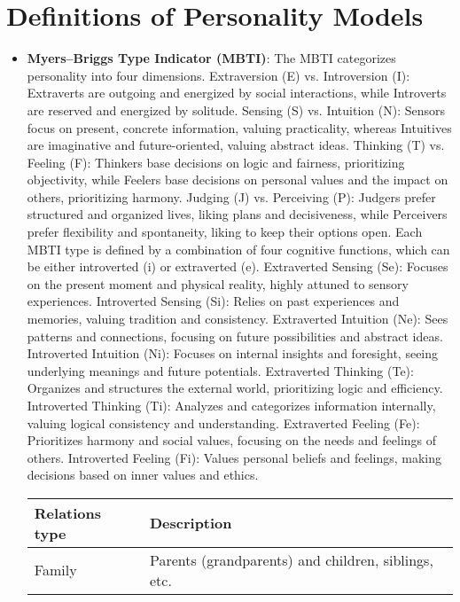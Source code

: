\appendix
\section{Definitions of Personality Models}
\label{sec:appendixA}

\begin{itemize}
  \item \textbf{Myers–Briggs Type Indicator (MBTI)}: The MBTI categorizes personality into four dimensions. Extraversion (E) vs. Introversion (I): Extraverts are outgoing and energized by social interactions, while Introverts are reserved and energized by solitude. Sensing (S) vs. Intuition (N): Sensors focus on present, concrete information, valuing practicality, whereas Intuitives are imaginative and future-oriented, valuing abstract ideas. Thinking (T) vs. Feeling (F): Thinkers base decisions on logic and fairness, prioritizing objectivity, while Feelers base decisions on personal values and the impact on others, prioritizing harmony. Judging (J) vs. Perceiving (P): Judgers prefer structured and organized lives, liking plans and decisiveness, while Perceivers prefer flexibility and spontaneity, liking to keep their options open. Each MBTI type is defined by a combination of four cognitive functions, which can be either introverted (i) or extraverted (e). Extraverted Sensing (Se): Focuses on the present moment and physical reality, highly attuned to sensory experiences. Introverted Sensing (Si): Relies on past experiences and memories, valuing tradition and consistency. Extraverted Intuition (Ne): Sees patterns and connections, focusing on future possibilities and abstract ideas. Introverted Intuition (Ni): Focuses on internal insights and foresight, seeing underlying meanings and future potentials. Extraverted Thinking (Te): Organizes and structures the external world, prioritizing logic and efficiency. Introverted Thinking (Ti): Analyzes and categorizes information internally, valuing logical consistency and understanding. Extraverted Feeling (Fe): Prioritizes harmony and social values, focusing on the needs and feelings of others. Introverted Feeling (Fi): Values personal beliefs and feelings, making decisions based on inner values and ethics.
  \begin{table*}[ht]
    \centering
    \small
    \begin{tabular}{ll}
      \hline
      \textbf{Relations type} & \textbf{Description}\\
      \hline
      Family & Parents (grandparents) and children, siblings, etc.\\

\end{tabular}
\end{table*}
\end{itemize}
